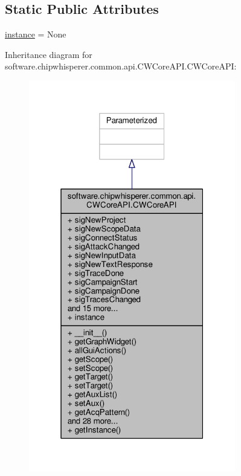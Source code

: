 \subsection*{Static Public Attributes}
\begin{DoxyCompactItemize}
\item 
\hyperlink{classsoftware_1_1chipwhisperer_1_1common_1_1api_1_1CWCoreAPI_1_1CWCoreAPI_a32f6b93cd965f6c04ff8ce380300655d}{instance} = None
\end{DoxyCompactItemize}


Inheritance diagram for software.\+chipwhisperer.\+common.\+api.\+C\+W\+Core\+A\+P\+I.\+C\+W\+Core\+A\+P\+I\+:\nopagebreak
\begin{figure}[H]
\begin{center}
\leavevmode
\includegraphics[width=256pt]{d7/d81/classsoftware_1_1chipwhisperer_1_1common_1_1api_1_1CWCoreAPI_1_1CWCoreAPI__inherit__graph}
\end{center}
\end{figure}


